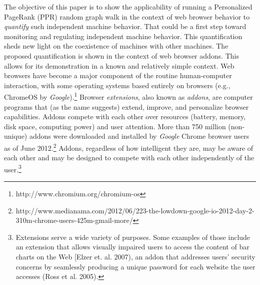 \documentclass{article} %
\begin{document}
The objective of this paper is to show the applicability of running a Personalized PageRank (PPR) random graph walk in the context of web browser behavior to \textit{quantify} such independent machine behavior. That could be a first step toward monitoring and regulating independent machine behavior. This quantification sheds new light on the coexistence of machines with other machines. The proposed quantification is shown in the context of web browser addons. This allows for its demonstration in a known and relatively simple context. Web browsers have become a major component of the routine human-computer interaction, with some operating systems based entirely on browsers (e.g., ChromeOS by \textit{Google}).\footnote{ http://www.chromium.org/chromium-os} Browser \textit{extensions}, also known as \textit{addons}, are computer programs that (as the name suggests) extend, improve, and personalize browser capabilities. Addons compete with each other over resources (battery, memory, disk space, computing power) and user attention. More than 750 million (non-unique) addons were downloaded and installed by \textit{Google} Chrome browser users as of June 2012.\footnote{ http://www.medianama.com/2012/06/223-the-lowdown-google-io-2012-day-2-310m-chrome-users-425m-gmail-more/} Addons, regardless of how intelligent they are, may be aware of each other and may be designed to compete with each other independently of the user.\footnote{ Extensions serve a wide variety of purposes. Some examples of those include an extension that allows visually impaired users to access the content of bar charts on the Web [Elzer et. al. 2007), an addon that addresses users' security concerns by seamlessly producing a unique password for each website the user accesses (Ross et al. 2005). } 
\end{document}

